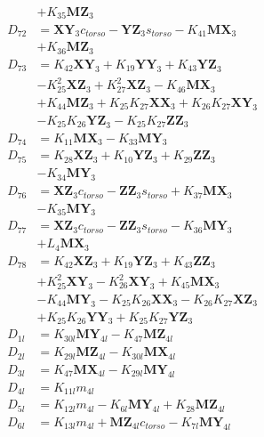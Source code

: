 \begin{multicols}{2}
\begin{align}
&+ K_{35}\mathbf{MZ}_3 \nonumber \\
D_{72} &= \mathbf{XY}_3c_{torso} - \mathbf{YZ}_3s_{torso} - K_{41}\mathbf{MX}_3  \nonumber \\
&+ K_{36}\mathbf{MZ}_3 \nonumber \\
D_{73} &= K_{42}\mathbf{XY}_3 + K_{19}\mathbf{YY}_3 + K_{43}\mathbf{YZ}_3  \nonumber \\
&- K_{25}^2\mathbf{XZ}_3 + K_{27}^2\mathbf{XZ}_3 - K_{46}\mathbf{MX}_3  \nonumber \\
&+ K_{44}\mathbf{MZ}_3 + K_{25}K_{27}\mathbf{XX}_3 + K_{26}K_{27}\mathbf{XY}_3  \nonumber \\
&- K_{25}K_{26}\mathbf{YZ}_3 - K_{25}K_{27}\mathbf{ZZ}_3 \nonumber \\
D_{74} &= K_{11}\mathbf{MX}_3 - K_{33}\mathbf{MY}_3 \nonumber \\
D_{75} &= K_{28}\mathbf{XZ}_3 + K_{10}\mathbf{YZ}_3 + K_{29}\mathbf{ZZ}_3  \nonumber \\
&- K_{34}\mathbf{MY}_3 \nonumber \\
D_{76} &= \mathbf{XZ}_3c_{torso} - \mathbf{ZZ}_3s_{torso} + K_{37}\mathbf{MX}_3  \nonumber \\
&- K_{35}\mathbf{MY}_3 \nonumber \\
D_{77} &= \mathbf{XZ}_3c_{torso} - \mathbf{ZZ}_3s_{torso} - K_{36}\mathbf{MY}_3  \nonumber \\
&+ L_4\mathbf{MX}_3 \nonumber \\
D_{78} &= K_{42}\mathbf{XZ}_3 + K_{19}\mathbf{YZ}_3 + K_{43}\mathbf{ZZ}_3  \nonumber \\
&+ K_{25}^2\mathbf{XY}_3 - K_{26}^2\mathbf{XY}_3 + K_{45}\mathbf{MX}_3  \nonumber \\
&- K_{44}\mathbf{MY}_3 - K_{25}K_{26}\mathbf{XX}_3 - K_{26}K_{27}\mathbf{XZ}_3  \nonumber \\
&+ K_{25}K_{26}\mathbf{YY}_3 + K_{25}K_{27}\mathbf{YZ}_3 \nonumber \\
D_{1l} &= K_{30l}\mathbf{MY}_{4l} - K_{47}\mathbf{MZ}_{4l} \nonumber \\
D_{2l} &= K_{29l}\mathbf{MZ}_{4l} - K_{30l}\mathbf{MX}_{4l} \nonumber \\
D_{3l} &= K_{47}\mathbf{MX}_{4l} - K_{29l}\mathbf{MY}_{4l} \nonumber \\
D_{4l} &= K_{11l}m_{4l} \nonumber \\
D_{5l} &= K_{12l}m_{4l} - K_{6l}\mathbf{MY}_{4l} + K_{28}\mathbf{MZ}_{4l} \nonumber \\
D_{6l} &= K_{13l}m_{4l} + \mathbf{MZ}_{4l}c_{torso} - K_{7l}\mathbf{MY}_{4l} \nonumber \\

\end{align}
\end{multicols}
